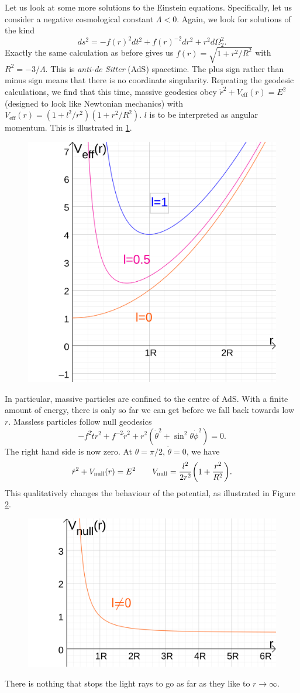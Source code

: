 Let us look at some more solutions to the Einstein equations. Specifically, let us consider a negative cosmological constant $\Lambda < 0$. Again, we look for solutions of the kind
\begin{equation}
  ds^2 = -f(r)^2 dt^2 + f(r)^{-2} dr^2 + r^2 d\Omega^2_2.
\end{equation}
Exactly the same calculation as before gives us $f(r) = \sqrt{1 + r^2/R^2}$ with $R^2 = -3/\Lambda$.
This is \emph{anti-de Sitter} (AdS) spacetime. The plus sign rather than minus sign means that there is no coordinate singularity.
Repeating the geodesic calculations, we find that this time, massive geodesics obey $\dot{r}^2 + V_{\text{eff}}(r) = E^2$ (designed to look like Newtonian mechanics) with $V_{\text{eff}}(r) = (1 + l^2/r^2) (1 + r^2/R^2)$.
$l$ is to be interpreted as angular momentum.
This is illustrated in \ref{fig:angmombar2}.
\begin{figure}[htpb]
  \centering
  \includegraphics[width=0.5\linewidth]{angmombar2}
  \caption{}
  \label{fig:angmombar2}
\end{figure}
In particular, massive particles are confined to the centre of AdS.
With a finite amount of energy, there is only so far we can get before we fall back towards low $r$.
Massless particles follow null geodesics 
\begin{equation}
  -f^2 \dot{t}r^2 + f^{-2} \dot{r}^2 + r^2(\dot{\theta}^2 + \sin^2\theta \dot{\phi}^2) = 0.
\end{equation}
The right hand side is now zero.
At $\theta = \pi/2$, $\dot{\theta} = 0$, we have 
\begin{equation}
  \label{eq:null-15}
  \dot{r}^2 + V_{\text{null}}(r) = E^2 \qquad
  V_{\text{null}} = \frac{l^2}{2r^2} \qty(1 + \frac{r^2}{R^2}).
\end{equation}
This qualitatively changes the behaviour of the potential, as illustrated in Figure \ref{fig:angmombar3}.
\begin{figure}[htpb]
  \centering
  \includegraphics[width=0.5\linewidth]{angmombar3}
  \caption{}
  \label{fig:angmombar3}
\end{figure}
There is nothing that stops the light rays to go as far as they like to $r \to \infty$.

